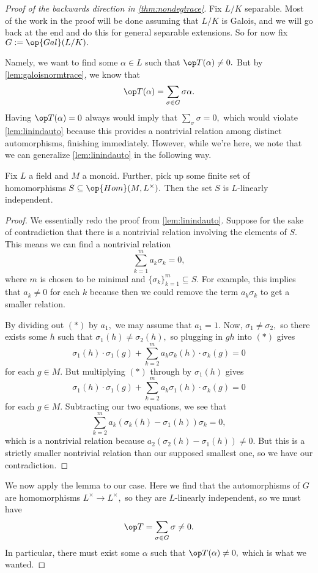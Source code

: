 \documentclass[../notes.tex]{subfiles}
\begin{document}
\begin{proof}[Proof of the backwards direction in \autoref{thm:nondegtrace}]
	Fix $L/K$ separable. Most of the work in the proof will be done assuming that $L/K$ is Galois, and we will go back at the end and do this for general separable extensions. So for now fix $G:=\op{Gal}(L/K).$

	Namely, we want to find some $\alpha\in L$ such that $\op T(\alpha)\ne0.$ But by \autoref{lem:galoisnormtrace}, we know that
	\[\op T(\alpha)=\sum_{\sigma\in G}\sigma\alpha.\]
	Having $\op T(\alpha)=0$ always would imply that $\sum_\sigma\sigma=0,$ which would violate \autoref{lem:linindauto} because this provides a nontrivial relation among distinct automorphisms, finishing immediately. However, while we're here, we note that we can generalize \autoref{lem:linindauto} in the following way.
	\begin{lemma}[Artin]
		Fix $L$ a field and $M$ a monoid. Further, pick up some finite set of homomorphisms $S\subseteq\op{Hom}(M,L^\times).$ Then the set $S$ is $L$-linearly independent.
	\end{lemma}
	\begin{proof}
		We essentially redo the proof from \autoref{lem:linindauto}. Suppose for the sake of contradiction that there is a nontrivial relation involving the elements of $S.$ This means we can find a nontrivial relation
		\[\sum_{k=1}^ma_k\sigma_k=0,\tag{$*$}\]
		where $m$ is chosen to be minimal and $\{\sigma_k\}_{k=1}^m\subseteq S.$ For example, this implies that $a_k\ne0$ for each $k$ because then we could remove the term $a_k\sigma_k$ to get a smaller relation.
		
		By dividing out $(*)$ by $a_1,$ we may assume that $a_1=1.$ Now, $\sigma_1\ne\sigma_2,$ so there exists some $h$ such that $\sigma_1(h)\ne\sigma_2(h),$ so plugging in $gh$ into $(*)$ gives
		\[\sigma_1(h)\cdot\sigma_1(g)+\sum_{k=2}^ma_k\sigma_k(h)\cdot\sigma_k(g)=0\]
		for each $g\in M.$ But multiplying $(*)$ through by $\sigma_1(h)$ gives
		\[\sigma_1(h)\cdot\sigma_1(g)+\sum_{k=2}^ma_k\sigma_1(h)\cdot\sigma_k(g)=0\]
		for each $g\in M.$ Subtracting our two equations, we see that
		\[\sum_{k=2}^ma_k(\sigma_k(h)-\sigma_1(h))\sigma_k=0,\]
		which is a nontrivial relation because $a_2(\sigma_2(h)-\sigma_1(h))\ne0.$ But this is a strictly smaller nontrivial relation than our supposed smallest one, so we have our contradiction.
	\end{proof}
	We now apply the lemma to our case. Here we find that the automorphisms of $G$ are homomorphisms $L^\times\to L^\times,$ so they are $L$-linearly independent, so we must have
	\[\op T=\sum_{\sigma\in G}\sigma\ne0.\]
	In particular, there must exist some $\alpha$ such that $\op T(\alpha)\ne0,$ which is what we wanted.


\end{proof}
\end{document}
